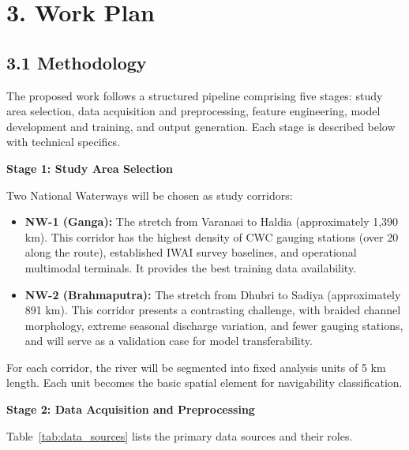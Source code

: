 \documentclass[12pt,a4paper]{article}
\begin{document}
\newpage
\section*{3. Work Plan}

\subsection*{3.1 Methodology}

The proposed work follows a structured pipeline comprising five stages: study area selection, data acquisition and preprocessing, feature engineering, model development and training, and output generation. Each stage is described below with technical specifics.

\vspace{0.4cm}
\noindent\textbf{Stage 1: Study Area Selection}

Two National Waterways will be chosen as study corridors:

\begin{itemize}[leftmargin=1.5cm]
\item \textbf{NW-1 (Ganga):} The stretch from Varanasi to Haldia (approximately 1,390 km). This corridor has the highest density of CWC gauging stations (over 20 along the route), established IWAI survey baselines, and operational multimodal terminals. It provides the best training data availability.
\item \textbf{NW-2 (Brahmaputra):} The stretch from Dhubri to Sadiya (approximately 891 km). This corridor presents a contrasting challenge, with braided channel morphology, extreme seasonal discharge variation, and fewer gauging stations, and will serve as a validation case for model transferability.
\end{itemize}

For each corridor, the river will be segmented into fixed analysis units of 5 km length. Each unit becomes the basic spatial element for navigability classification.

\vspace{0.4cm}
\noindent\textbf{Stage 2: Data Acquisition and Preprocessing}

Table~\ref{tab:data_sources} lists the primary data sources and their roles.
\end{document}
